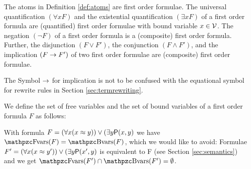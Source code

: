 
\begin{definition}\label{def:syntax:FOF}
	The atoms in Definition \vref{def:atoms} are {\myem first order formulae}.
	The universal quantification $(\forall x F)$
	and the existential quantification $(\exists x F)$
	of a first order formula are (quantified) first order formulae
	with {\myem bound} variable $x\in\mathcal{V}$.
	The negation $(\lnot F)$ of a first order formula
	is a (composite) first order formula.
	Further, the disjunction $(F \lor F')$,
	the conjunction $(F \land F') $,
	and the implication $(F \rightarrow F')$
	of two first order formulae
	are (composite) first order formulae.
\end{definition}

\begin{remark}
	The Symbol $\rightarrow$ for implication is not to be confused
	with the equational symbol for rewrite rules in Section \ref{sec:termrewriting}.
\end{remark}

\begin{definition}\label{def:fof:fvars}\label{def:fof:bvars}
	We define the set of {\myem free} variables and the set of {\myem bound} variables
	of a first order formula $F$ as follows:
\end{definition}

\begin{example}
	With formula $F = (\forall x (x\approx y)) \lor (\exists y \mathsf{P}(x,y)$
	we have $\fvar(F) = \bvar(F)$, which we would like to avoid:
	Formulae
	$F' = (\forall x (x\approx y')) \lor (\exists y \mathsf{P}(x',y)$
	is equivalent to F (see Section \vref{sec:semantics})
	and we get
	$\fvar(F') \cap \bvar(F') = \emptyset$.
\end{example}

